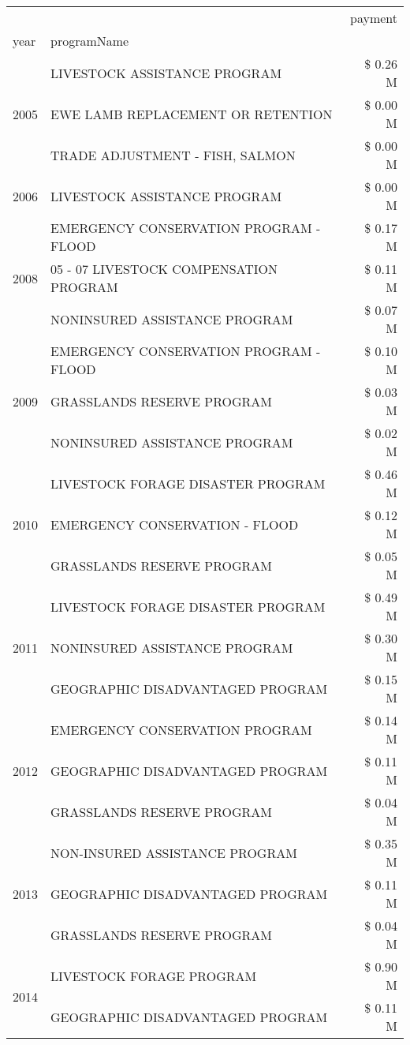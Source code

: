 \begin{tabular}{llr}
\toprule
 &  & payment \\
year & programName &  \\
\midrule
\multirow[t]{3}{*}{2005} & LIVESTOCK ASSISTANCE PROGRAM & \$ 0.26 M \\
 & EWE LAMB REPLACEMENT OR RETENTION & \$ 0.00 M \\
 & TRADE ADJUSTMENT - FISH, SALMON & \$ 0.00 M \\
\cline{1-3}
2006 & LIVESTOCK ASSISTANCE PROGRAM & \$ 0.00 M \\
\cline{1-3}
\multirow[t]{3}{*}{2008} & EMERGENCY CONSERVATION PROGRAM - FLOOD & \$ 0.17 M \\
 & 05 - 07 LIVESTOCK COMPENSATION PROGRAM & \$ 0.11 M \\
 & NONINSURED ASSISTANCE PROGRAM & \$ 0.07 M \\
\cline{1-3}
\multirow[t]{3}{*}{2009} & EMERGENCY CONSERVATION PROGRAM - FLOOD & \$ 0.10 M \\
 & GRASSLANDS RESERVE PROGRAM & \$ 0.03 M \\
 & NONINSURED ASSISTANCE PROGRAM & \$ 0.02 M \\
\cline{1-3}
\multirow[t]{3}{*}{2010} & LIVESTOCK FORAGE DISASTER PROGRAM & \$ 0.46 M \\
 & EMERGENCY CONSERVATION - FLOOD & \$ 0.12 M \\
 & GRASSLANDS RESERVE PROGRAM & \$ 0.05 M \\
\cline{1-3}
\multirow[t]{3}{*}{2011} & LIVESTOCK FORAGE DISASTER PROGRAM & \$ 0.49 M \\
 & NONINSURED ASSISTANCE PROGRAM & \$ 0.30 M \\
 & GEOGRAPHIC DISADVANTAGED PROGRAM & \$ 0.15 M \\
\cline{1-3}
\multirow[t]{3}{*}{2012} & EMERGENCY CONSERVATION PROGRAM & \$ 0.14 M \\
 & GEOGRAPHIC DISADVANTAGED PROGRAM & \$ 0.11 M \\
 & GRASSLANDS RESERVE PROGRAM & \$ 0.04 M \\
\cline{1-3}
\multirow[t]{3}{*}{2013} & NON-INSURED ASSISTANCE PROGRAM & \$ 0.35 M \\
 & GEOGRAPHIC DISADVANTAGED PROGRAM & \$ 0.11 M \\
 & GRASSLANDS RESERVE PROGRAM & \$ 0.04 M \\
\cline{1-3}
\multirow[t]{3}{*}{2014} & LIVESTOCK FORAGE PROGRAM & \$ 0.90 M \\
 & GEOGRAPHIC DISADVANTAGED PROGRAM & \$ 0.11 M \\

\end{tabular}

